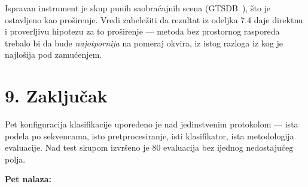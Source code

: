 \documentclass[11pt,a4paper]{article}
\begin{document}
Ispravan instrument je skup punih saobraćajnih scena (GTSDB~\cite{gtsdb}), što je ostavljeno kao
proširenje. Vredi zabeležiti da rezultat iz odeljka 7.4 daje direktnu i proverljivu hipotezu za
to proširenje — metoda bez prostornog rasporeda trebalo bi da bude \emph{najotpornija} na pomeraj
okvira, iz istog razloga iz kog je najlošija pod zamućenjem.

\newpage

\section*{9. Zaključak}

Pet konfiguracija klasifikacije upoređeno je nad jedinstvenim protokolom — ista podela po
sekvencama, isto pretprocesiranje, isti klasifikator, ista metodologija evaluacije. Nad test
skupom izvršeno je 80 evaluacija bez ijednog nedostajućeg polja.

\textbf{Pet nalaza:}
\end{document}
